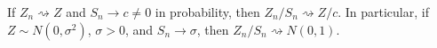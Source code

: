 If \(Z_n\rightsquigarrow Z\) and \(S_n\to c\ne0\) in probability, then \(Z_n/S_n\rightsquigarrow Z/c\). In particular, if \(Z\sim N(0,\sigma^2)\), \(\sigma>0\), and \(S_n\to\sigma\), then \(Z_n/S_n\rightsquigarrow N(0,1)\).